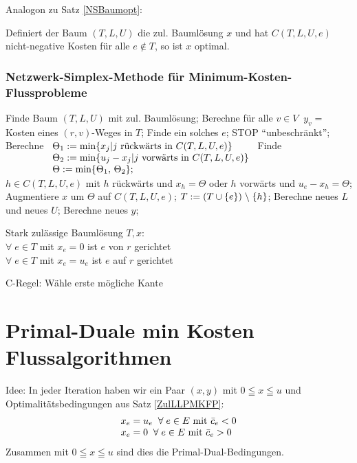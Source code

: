Analogon zu Satz \ref{NSBaumopt}:
\begin{satz}
Definiert der Baum $(T,L,U)$ die zul. Baumlösung $x$ und hat $C(T,L,U,e)$
nicht-negative Kosten für alle $e\not\in T$, so ist $x$ optimal.
\end{satz}

\subsubsection{Netzwerk-Simplex-Methode für Minimum-Kosten-Flussprobleme}

\begin{algorithmic}
\STATE Finde Baum $(T,L,U)$ mit zul. Baumlösung;
\STATE Berechne für alle $v \in V \; \; y_{v} =$ Kosten eines $(r,v)$-Weges
in $T$;
\STATE Finde ein solches $e$;
\STATE STOP "`unbeschränkt"';
\ENDIF
\STATE Berechne $\begin{array}[t]{l}\Theta_{1} := \min\{x_{j}|j \mbox{
rückwärts in }C(T,L,U,e)\}\\
\Theta_{2} := \min\{u_{j} -x_{j}|j \mbox{ vorwärts in }C(T,L,U,e)\}\\
\Theta := \min\{\Theta_{1}, \, \Theta_{2}\};\\
\end{array}$
\STATE Finde $h \in C(T,L,U,e)$ mit $h$ rückwärts und $x_{h} = \Theta$ oder
$h$ vorwärts und $u_{e} - x_{h} = \Theta$;
\STATE Augmentiere $x$ um $\Theta$ auf $C(T,L,U,e)$;
\STATE $T := (T \cup \{e\}) \;\backslash\; \{h\}$;
\STATE Berechne neues $L$ und neues $U$;
\STATE Berechne neues $y$;
\ENDWHILE
\end{algorithmic}

Stark zulässige Baumlösung $T,x$:\\
$\forall \; e \in T$ mit $x_{e} =0$ ist $e$ von $r$ gerichtet\\
$\forall \; e \in T$ mit $x_{e} =u_{e}$ ist $e$ auf $r$ gerichtet

C-Regel: Wähle erste mögliche Kante

\section{Primal-Duale min Kosten Flussalgorithmen}

Idee: In jeder Iteration haben wir ein Paar $(x,y)$ mit $0 \leqq x \leqq u$
und Optimalitätsbedingungen aus Satz \ref{ZulLLPMKFP}:
\[
\begin{array}{l}
x_{e}=u_{e} \; \; \forall \; e \in E \mbox{ mit } \bar{c}_{e} < 0\\
x_{e}=0 \; \; \forall \; e \in E \mbox{ mit }\bar{c}_{e} > 0
\end{array}
\]
Zusammen mit $0 \leqq x \leqq u$ sind dies die Primal-Dual-Bedingungen.

